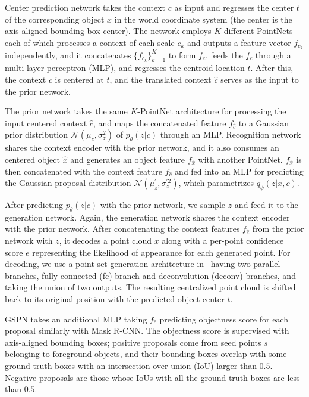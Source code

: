 \documentclass[10pt,twocolumn,letterpaper]{article}
\begin{document}
Center prediction network takes the context $c$ as input and regresses the center $t$ of the corresponding object $x$ in the world coordinate system (the center is the axis-aligned bounding box center).
The network employs $K$ different PointNets each of which processes a context of each scale $c_k$ and outputs a feature vector $f_{c_k}$ independently, and it concatenates $\{f_{c_k}\}_{k=1}^K$ to form $f_c$, feeds the $f_c$ through a multi-layer perceptron (MLP), and regresses the centroid location $t$.
After this, the context $c$ is centered at $t$, and the translated context $\hat{c}$ serves as the input to the prior network.

The prior network takes the same $K$-PointNet architecture for processing the input centered context $\hat{c}$, and maps the concatenated feature $f_{\hat{c}}$ to a Gaussian prior distribution $\mathcal{N}(\mu_z, \sigma_z^2)$ of $p_{\theta}(z|c)$ through an MLP. Recognition network shares the context encoder with the prior network, and it also consumes an centered object $\hat{x}$ and generates an object feature $f_{\hat{x}}$ with another PointNet. $f_{\hat{x}}$ is then concatenated with the context feature $f_{\hat{c}}$ and fed into an MLP for predicting the Gaussian proposal distribution $\mathcal{N}(\mu_z^{\prime}, \sigma_z^{\prime 2})$, which parametrizes $q_{\phi}(z|x,c)$.

After predicting $p_{\theta}(z|c)$ with the prior network, we sample $z$ and feed it to the generation network. Again, the generation network shares the context encoder with the prior network. After concatenating the context features $f_{\hat{c}}$ from the prior network with $z$, it decodes a point cloud $\tilde{x}$ along with a per-point confidence score $e$ representing the likelihood of appearance for each generated point.
For decoding, we use a point set generation architecture in~\cite{fan2017point} having two parallel branches, fully-connected (fc) branch and deconvolution (deconv) branches, and taking the union of two outputs.
The resulting centralized point cloud is shifted back to its original position with the predicted object center $t$.

GSPN takes an additional MLP taking $f_{\hat{c}}$ predicting objectness score for each proposal similarly with Mask R-CNN.
The objectness score is supervised with axis-aligned bounding boxes; positive proposals come from seed points $s$ belonging to foreground objects, and their bounding boxes overlap with some ground truth boxes with an intersection over union (IoU) larger than $0.5$. Negative proposals are those whose IoUs with all the ground truth boxes are less than $0.5$. 
\end{document}
